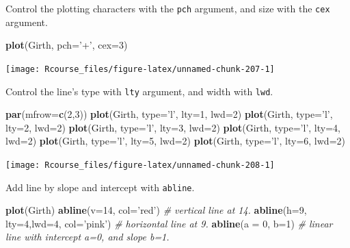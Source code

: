 \documentclass[]{book}
\newenvironment{Shaded}{\begin{snugshade}}{\end{snugshade}}
\newcommand{\KeywordTok}[1]{\textcolor[rgb]{0.13,0.29,0.53}{\textbf{#1}}}
\newcommand{\DataTypeTok}[1]{\textcolor[rgb]{0.13,0.29,0.53}{#1}}
\newcommand{\DecValTok}[1]{\textcolor[rgb]{0.00,0.00,0.81}{#1}}
\newcommand{\StringTok}[1]{\textcolor[rgb]{0.31,0.60,0.02}{#1}}
\newcommand{\CommentTok}[1]{\textcolor[rgb]{0.56,0.35,0.01}{\textit{#1}}}
\newcommand{\NormalTok}[1]{#1}
\theoremstyle{definition}
\theoremstyle{definition}
\theoremstyle{definition}
\theoremstyle{remark}
\begin{document}
Control the plotting characters with the \texttt{pch} argument, and size
with the \texttt{cex} argument.

\begin{Shaded}
\begin{Highlighting}[]
\KeywordTok{plot}\NormalTok{(Girth, }\DataTypeTok{pch=}\StringTok{'+'}\NormalTok{, }\DataTypeTok{cex=}\DecValTok{3}\NormalTok{)}
\end{Highlighting}
\end{Shaded}

\texttt{[image: Rcourse\_files/figure-latex/unnamed-chunk-207-1]}

Control the line's type with \texttt{lty} argument, and width with
\texttt{lwd}.

\begin{Shaded}
\begin{Highlighting}[]
\KeywordTok{par}\NormalTok{(}\DataTypeTok{mfrow=}\KeywordTok{c}\NormalTok{(}\DecValTok{2}\NormalTok{,}\DecValTok{3}\NormalTok{))}
\KeywordTok{plot}\NormalTok{(Girth, }\DataTypeTok{type=}\StringTok{'l'}\NormalTok{, }\DataTypeTok{lty=}\DecValTok{1}\NormalTok{, }\DataTypeTok{lwd=}\DecValTok{2}\NormalTok{)}
\KeywordTok{plot}\NormalTok{(Girth, }\DataTypeTok{type=}\StringTok{'l'}\NormalTok{, }\DataTypeTok{lty=}\DecValTok{2}\NormalTok{, }\DataTypeTok{lwd=}\DecValTok{2}\NormalTok{)}
\KeywordTok{plot}\NormalTok{(Girth, }\DataTypeTok{type=}\StringTok{'l'}\NormalTok{, }\DataTypeTok{lty=}\DecValTok{3}\NormalTok{, }\DataTypeTok{lwd=}\DecValTok{2}\NormalTok{)}
\KeywordTok{plot}\NormalTok{(Girth, }\DataTypeTok{type=}\StringTok{'l'}\NormalTok{, }\DataTypeTok{lty=}\DecValTok{4}\NormalTok{, }\DataTypeTok{lwd=}\DecValTok{2}\NormalTok{)}
\KeywordTok{plot}\NormalTok{(Girth, }\DataTypeTok{type=}\StringTok{'l'}\NormalTok{, }\DataTypeTok{lty=}\DecValTok{5}\NormalTok{, }\DataTypeTok{lwd=}\DecValTok{2}\NormalTok{)}
\KeywordTok{plot}\NormalTok{(Girth, }\DataTypeTok{type=}\StringTok{'l'}\NormalTok{, }\DataTypeTok{lty=}\DecValTok{6}\NormalTok{, }\DataTypeTok{lwd=}\DecValTok{2}\NormalTok{)}
\end{Highlighting}
\end{Shaded}

\texttt{[image: Rcourse\_files/figure-latex/unnamed-chunk-208-1]}

Add line by slope and intercept with \texttt{abline}.

\begin{Shaded}
\begin{Highlighting}[]
\KeywordTok{plot}\NormalTok{(Girth)}
\KeywordTok{abline}\NormalTok{(}\DataTypeTok{v=}\DecValTok{14}\NormalTok{, }\DataTypeTok{col=}\StringTok{'red'}\NormalTok{) }\CommentTok{# vertical line at 14.}
\KeywordTok{abline}\NormalTok{(}\DataTypeTok{h=}\DecValTok{9}\NormalTok{, }\DataTypeTok{lty=}\DecValTok{4}\NormalTok{,}\DataTypeTok{lwd=}\DecValTok{4}\NormalTok{, }\DataTypeTok{col=}\StringTok{'pink'}\NormalTok{) }\CommentTok{# horizontal line at 9.}
\KeywordTok{abline}\NormalTok{(}\DataTypeTok{a =} \DecValTok{0}\NormalTok{, }\DataTypeTok{b=}\DecValTok{1}\NormalTok{) }\CommentTok{# linear line with intercept a=0, and slope b=1.}
\end{Highlighting}
\end{Shaded}
\end{document}
